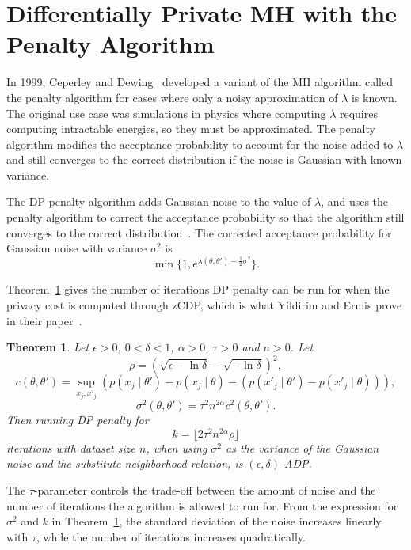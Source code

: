 \documentclass[english,twoside,openright]{HYgraduMLDS}
\newtheorem{theorem}[lemma]{Theorem}
\begin{document}
\section{Differentially Private MH with the Penalty Algorithm}\label{dp_penalty_section}

In 1999, Ceperley and Dewing~\cite{CeD99} developed a variant of 
the MH algorithm called the penalty
algorithm for cases where only a noisy approximation of \(\lambda\)
is known. The original use case was simulations in physics where computing
\(\lambda\) requires computing intractable energies, so they must be approximated.
The penalty algorithm modifies the acceptance probability to account for the
noise added to \(\lambda\) and still converges to the correct distribution if 
the noise is Gaussian with known variance.

The DP penalty algorithm adds Gaussian noise to the value of \(\lambda\), and 
uses the penalty algorithm to correct the acceptance probability so that 
the algorithm still converges to the correct distribution~\cite{YildirimE19}.
The corrected acceptance probability for Gaussian noise with variance 
\(\sigma^2\) is 
\[
    \min\{1, e^{\lambda(\theta, \theta') - \frac{1}{2}\sigma^2}\}.
\]

Theorem~\ref{DP_penalty_theorem_zcdp} gives the number of iterations DP penalty 
can be run for when the privacy cost is computed through zCDP, which is 
what Yildirim and Ermis prove in their paper~\cite{YildirimE19}.

\begin{theorem}\label{DP_penalty_theorem_zcdp}
  Let \(\epsilon > 0\), \(0 < \delta < 1\), \(\alpha > 0\), \(\tau > 0\) and
  \(n > 0\).
    Let
    \[
        \rho = (\sqrt{\epsilon - \ln \delta} - \sqrt{-\ln \delta})^2,
    \]
    \[
        c(\theta, \theta') = \sup_{x_j, x'_j} (p(x_j\mid \theta') - p(x_j\mid \theta) 
        - (p(x'_j\mid \theta') - p(x'_j\mid \theta))),
    \]
    \[
        \sigma^2(\theta, \theta') = \tau^2 n^{2\alpha}c^2(\theta, \theta').
    \]
    Then running DP penalty for
    \[
        k = \lfloor 2\tau^2 n^{2\alpha} \rho\rfloor
    \]
    iterations with dataset size \(n\), when using \(\sigma^2\) as the
    variance of the Gaussian noise
    and the substitute neighborhood relation, is \((\epsilon, \delta)\)-ADP.
\end{theorem}

The \(\tau\)-parameter controls the trade-off between the amount of noise
and the number of iterations the algorithm is allowed to run for. From the
expression for \(\sigma^{2}\) and \(k\) in Theorem~\ref{DP_penalty_theorem_zcdp},
the standard deviation of the noise increases linearly with \(\tau\), while
the number of iterations increases quadratically.
\end{document}
